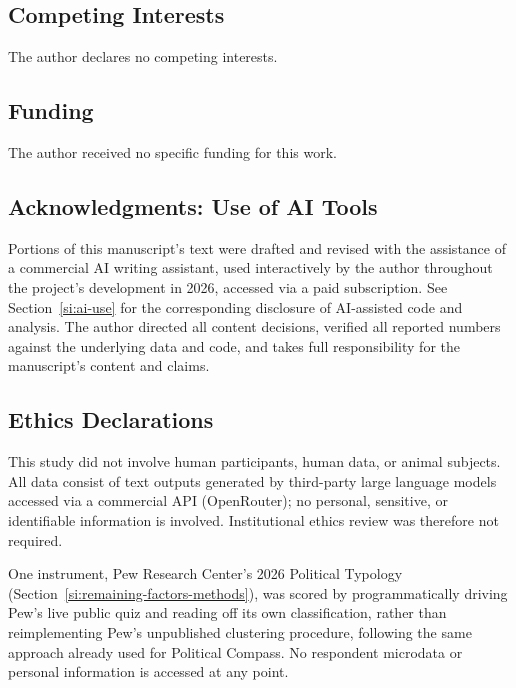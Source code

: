 \documentclass[11pt]{article}
\begin{document}
\subsection*{Competing Interests}
The author declares no competing interests.

\subsection*{Funding}
The author received no specific funding for this work.

\subsection*{Acknowledgments: Use of AI Tools}
Portions of this manuscript's text were drafted and revised with the
assistance of a commercial AI writing assistant, used interactively by the
author throughout the project's development in 2026, accessed via a paid
subscription. See Section~\ref{si:ai-use} for the corresponding disclosure
of AI-assisted code and analysis. The author directed all content
decisions, verified all reported numbers against the underlying data and
code, and takes full responsibility for the manuscript's content and
claims.

\subsection*{Ethics Declarations}
This study did not involve human participants, human data, or animal
subjects. All data consist of text outputs generated by third-party large
language models accessed via a commercial API (OpenRouter); no personal,
sensitive, or identifiable information is involved. Institutional ethics
review was therefore not required.

One instrument, Pew Research Center's 2026 Political Typology (Section~\ref{si:remaining-factors-methods}),
was scored by programmatically driving Pew's live public quiz and reading
off its own classification, rather than reimplementing Pew's unpublished
clustering procedure, following the same approach already used for Political Compass. No respondent microdata or personal information is accessed at any point.



\end{document}
